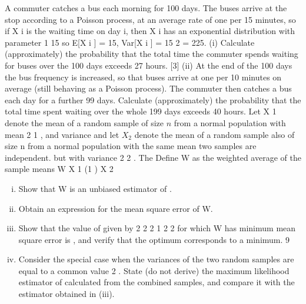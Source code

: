 \documentclass[a4paper,12pt]{article}
\begin{document}
\begin{enumerate}
A commuter catches a bus each morning for 100 days. The buses arrive at the stop according to a Poisson process, at an average rate of one per 15 minutes, so if X i is the waiting time on day i, then X i has an exponential distribution with parameter
1
15
so
E[X i ] = 15, Var[X i ] = 15 2 = 225.
(i) Calculate (approximately) the probability that the total time the commuter
spends waiting for buses over the 100 days exceeds 27 hours.
[3]
(ii) At the end of the 100 days the bus frequency is increased, so that buses arrive at one per 10 minutes on average (still behaving as a Poisson process). The commuter then catches a bus each day for a further 99 days. Calculate (approximately) the probability that the total time spent waiting over the whole 199 days exceeds 40 hours.
Let X 1 denote the mean of a random sample of size $n$ from a normal population with
mean
2
1 ,
and variance
and let $X_2$ denote the mean of a random sample also of size n from a normal population with the same mean
two samples are independent.
but with variance
2
2 .
The
Define W as the weighted average of the sample means
W
X 1 (1
) X 2

\begin{enumerate}[(i)]
\item Show that W is an unbiased estimator of . 
\item Obtain an expression for the mean square error of W.
\item  Show that the value of
given by
2
2
2
1
2
2
for which W has minimum mean square error is
,
and verify that the optimum corresponds to a minimum.
9
\item  Consider the special case when the variances of the two random samples are equal to a common value 2 . State (do not derive) the maximum likelihood estimator of calculated from the combined samples, and compare it with the estimator obtained in (iii).
\end{enumerate}



\end{enumerate}
\end{document}
